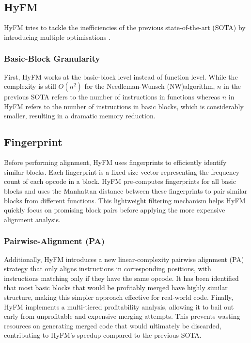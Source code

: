 \subsection{HyFM}
HyFM tries to tackle the inefficiencies of the previous state-of-the-art (SOTA) by introducing multiple optimisations \cite{HyFM:FunctionMergingForFree}. 

\subsubsection{Basic-Block Granularity} \label{HyFM:BasicBlockGranularity}
First, HyFM works at the basic-block level instead of function level. While the complexity is still $O(n^2)$ for the Needleman-Wunsch (NW)algorithm, $n$ in the previous SOTA refers to the number of instructions in functions whereas $n$ in HyFM refers to the number of instructions in basic blocks, which is considerably smaller, resulting in a dramatic memory reduction.

\subsection{Fingerprint} \label{HyFM:FingerprintDistance}
Before performing alignment, HyFM uses fingerprints to efficiently identify similar blocks. Each fingerprint is a fixed-size vector representing the frequency count of each opcode in a block. HyFM pre-computes fingerprints for all basic blocks and uses the Manhattan distance between these fingerprints to pair similar blocks from different functions. This lightweight filtering mechanism helps HyFM quickly focus on promising block pairs before applying the more expensive alignment analysis.


\subsubsection{Pairwise-Alignment (PA)} \label{HyFM:PairwiseAlignment}
Additionally, HyFM introduces a new linear-complexity pairwise alignment (PA) strategy that only aligns instructions in corresponding positions, with instructions matching only if they have the same opcode. It has been identified that most basic blocks that would be profitably merged have highly similar structure, making this simpler approach effective for real-world code. Finally, HyFM implements a multi-tiered profitability analysis, allowing it to bail out early from unprofitable and expensive merging attempts. This prevents wasting resources on generating merged code that would ultimately be discarded, contributing to HyFM's speedup compared to the previous SOTA.

